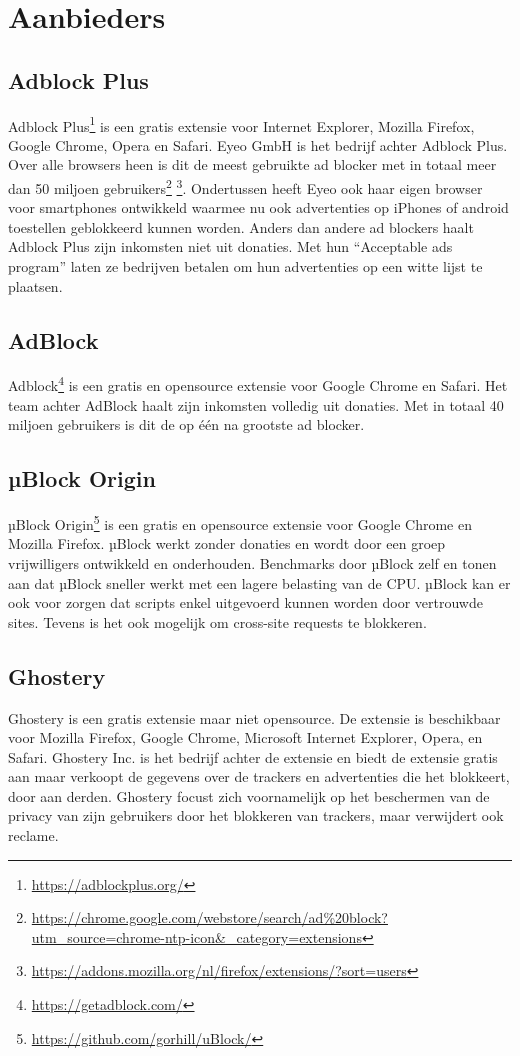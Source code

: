 \documentclass[pdftex,a4paper,12pt,twoside]{report}
\begin{document}
\section{Aanbieders}
\label{sec:Aanbieders}
\subsection{Adblock Plus}
\label{sec:Adblock Plus}
Adblock Plus\footnote{\url{https://adblockplus.org/}} is een gratis extensie voor Internet Explorer, Mozilla Firefox, Google Chrome, Opera en Safari. Eyeo GmbH is het bedrijf achter Adblock Plus. Over alle browsers heen is dit de meest gebruikte ad blocker met in totaal meer dan 50 miljoen gebruikers\footnote{\url{https://chrome.google.com/webstore/search/ad\%20block?utm_source=chrome-ntp-icon&_category=extensions}} \footnote{\url{https://addons.mozilla.org/nl/firefox/extensions/?sort=users}}. Ondertussen heeft Eyeo ook haar eigen browser voor smartphones ontwikkeld waarmee nu ook advertenties op iPhones of android toestellen geblokkeerd kunnen worden. Anders dan andere ad blockers haalt Adblock Plus zijn inkomsten niet uit donaties. Met hun "`Acceptable ads program"' laten ze bedrijven betalen om hun advertenties op een witte lijst te plaatsen.
\subsection{AdBlock}
\label{sec:AdBlock}
Adblock\footnote{\url{https://getadblock.com/}} is een gratis en opensource extensie voor Google Chrome en Safari. Het team achter AdBlock haalt zijn inkomsten volledig uit donaties. Met in totaal 40 miljoen gebruikers is dit de op één na grootste ad blocker.

\subsection{µBlock Origin}
\label{sec:uBlock Origin}
µBlock Origin\footnote{\url{https://github.com/gorhill/uBlock/}} is een gratis en opensource extensie voor Google Chrome en Mozilla Firefox. µBlock werkt zonder donaties en wordt door een groep vrijwilligers ontwikkeld en onderhouden. Benchmarks door µBlock zelf en \citep{PerformanceAB} tonen aan dat µBlock sneller werkt met een lagere belasting van de CPU. µBlock kan er ook voor zorgen dat scripts enkel uitgevoerd kunnen worden door vertrouwde sites. Tevens is het ook mogelijk om cross-site requests te blokkeren.

\subsection{Ghostery}
\label{sec:Ghostery}
Ghostery is een gratis extensie maar niet opensource. De extensie is beschikbaar voor  Mozilla Firefox, Google Chrome, Microsoft Internet Explorer, Opera, en Safari. Ghostery Inc. is het bedrijf achter de extensie en biedt de extensie gratis aan maar verkoopt de gegevens over de trackers en advertenties die het blokkeert, door aan derden. Ghostery focust zich voornamelijk op het beschermen van de privacy van zijn gebruikers door het blokkeren van trackers, maar verwijdert ook reclame.
\end{document}

